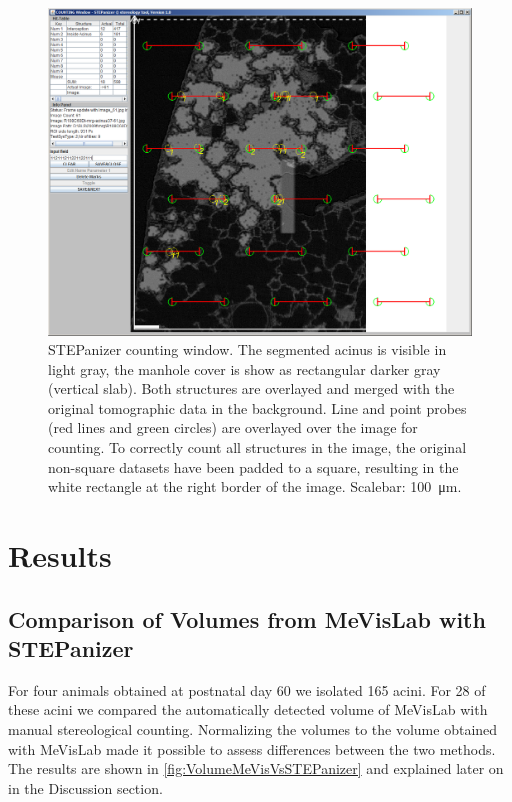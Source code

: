 \documentclass[%
	paper=a4,%
	abstract=true,%
	]{scrartcl}
\newcommand{\imsize}{\linewidth}
\begin{document}
\renewcommand{\imsize}{\linewidth}%
\begin{figure}
	\centering
	\includegraphics[width=\imsize]{img/CountingWindowSTEPanizer}
	\caption{STEPanizer counting window. The segmented acinus is visible in light gray, the manhole cover is show as rectangular darker gray (vertical slab). Both structures are overlayed and merged with the original tomographic data in the background. Line and point probes (red lines and green circles) are overlayed over the image for counting. To correctly count all structures in the image, the original non-square datasets have been padded to a square, resulting in the white rectangle at the right border of the image. Scalebar: \SI{100}{\micro\meter}.}
	\label{fig:STEPanizer}
\end{figure}

\section{Results\label{sec:Results}}
\subsection{Comparison of Volumes from MeVisLab with STEPanizer}
For four animals obtained at postnatal day 60 we isolated 165 acini. For 28 of these acini  we compared the automatically detected volume of MeVisLab with manual stereological counting. Normalizing the volumes to the volume obtained with MeVisLab made it possible to assess differences between the two methods. The results are shown in \autoref{fig:VolumeMeVisVsSTEPanizer}  and explained later on in the Discussion section.
\end{document}
